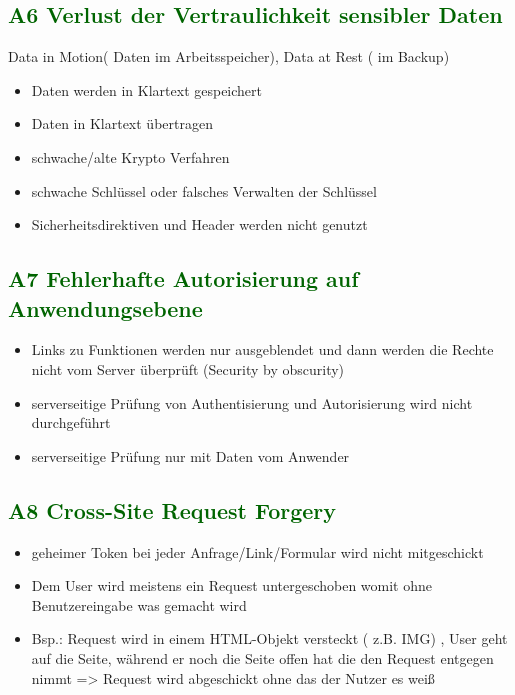 \subsection*{\textcolor{darkgreen}{A6 Verlust der Vertraulichkeit sensibler Daten}}
Data in Motion( Daten im Arbeitsspeicher), Data at Rest ( im Backup) 
	\begin{itemize}
	\item Daten werden in Klartext gespeichert
	\item Daten in Klartext übertragen
	\item schwache/alte Krypto Verfahren
	\item schwache Schlüssel oder falsches Verwalten der Schlüssel
	\item Sicherheitsdirektiven und Header werden nicht genutzt
	\end{itemize}

\subsection*{\textcolor{darkgreen}{A7 Fehlerhafte Autorisierung auf Anwendungsebene}}
\begin{itemize}
	\item Links zu Funktionen werden nur ausgeblendet und dann werden die Rechte nicht vom Server überprüft (Security by obscurity)
	\item serverseitige Prüfung von Authentisierung und Autorisierung wird nicht durchgeführt
	\item serverseitige Prüfung nur mit Daten vom Anwender
\end{itemize}

\subsection*{\textcolor{darkgreen}{A8 Cross-Site Request Forgery}}

\begin{itemize}
	\item geheimer Token bei jeder Anfrage/Link/Formular wird nicht mitgeschickt
	\item Dem User wird meistens ein Request untergeschoben womit ohne Benutzereingabe was gemacht wird
	\item Bsp.: Request wird in einem HTML-Objekt versteckt ( z.B. IMG) , User geht auf die Seite, während er noch die Seite offen hat die den Request entgegen nimmt => Request wird abgeschickt ohne das der Nutzer es weiß
\end{itemize}

